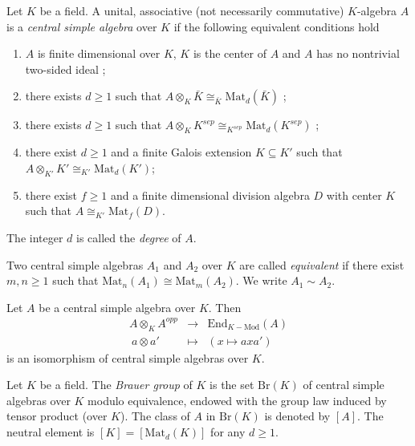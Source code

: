 \begin{theorem}
\label{theorem-central-simple-algebra}
Let $K$ be a field. A unital, associative (not necessarily commutative) 
$K$-algebra $A$ is a {\it central simple algebra} over $K$ if the following 
equivalent conditions hold
\begin{enumerate}
\item
$A$ is finite dimensional over $K$, $K$ is the center of $A$ and $A$ has no 
nontrivial two-sided ideal ;
\item
there exists $d \geq 1$ such that $A \otimes_K \bar K \cong_{\bar K} 
\text{Mat}_d(\bar K)$ ;
\item
there exists $d \geq 1$ such that $A \otimes_K K^{sep} \cong_{K^{sep}} 
\text{Mat}_d(K^{sep})$ ;
\item
there exist $d \geq 1$ and a finite Galois extension $K \subseteq K'$ such that 
$A \otimes_{K'} K' \cong_{K'} \text{Mat}_d(K')$; 
\item
there exist $f \geq 1$ and a finite dimensional division algebra $D$ with 
center $K$ such that $A \cong_{K'} \text{Mat}_f(D)$.
\end{enumerate}
The integer $d$ is called the {\it degree} of $A$. 
\end{theorem}

\begin{definition}
\label{definition-brauer-equivalent}
Two central simple algebras $A_1$ and $A_2$ over $K$ are called 
{\it equivalent} if there exist $m, n \geq 1$ such that $\text{Mat}_n(A_1) 
\cong \text{Mat}_m(A_2)$. We write $A_1 \sim A_2$.
\end{definition}

\begin{lemma}
\label{lemma-brauer-inverse}
Let $A$ be a central simple algebra over $K$. Then
$$
\begin{matrix}
A \otimes_K A^{opp} & \longrightarrow & \text{End}_{K-\text{Mod}}(A) \\
\ a \otimes a' & \longmapsto & (x \mapsto a x a')
\end{matrix}
$$
is an isomorphism of central simple algebras over $K$.
\end{lemma}

\begin{definition}
\label{definition-brauer-group}
Let $K$ be a field. The {\it Brauer group} of $K$ is the set $\text{Br} (K)$ 
of central simple algebras over $K$ modulo equivalence, endowed with the group 
law induced by tensor product (over $K$). The class of $A$ in $\text{Br} (K)$ 
is denoted by $[A]$. The neutral element is $[K] = [\text{Mat}_d(K)]$ for any 
$d \geq 1$.
\end{definition}

